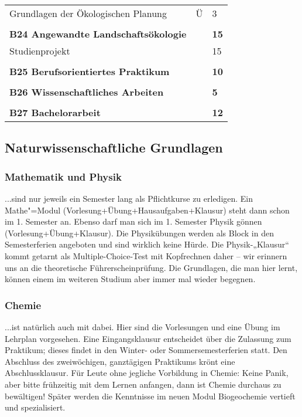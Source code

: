 \begin{longtable}{p{} p{} p{}}
Grundlagen der Ökologischen Planung & Ü & 3\\
&&\\
\textbf{B24 Angewandte Landschaftsökologie} && \textbf{15}\\
Studienprojekt & & 15\\
&&\\
\textbf{B25 Berufsorientiertes Praktikum} & & \textbf{10}\\
&&\\
\textbf{B26 Wissenschaftliches Arbeiten} & & \textbf{5}\\
&&\\
\textbf{B27 Bachelorarbeit} && \textbf{12}\\
\end{longtable}

\subsection*{Naturwissenschaftliche Grundlagen}
\subsubsection*{Mathematik und Physik}
...sind nur jeweils ein Semester lang als Pﬂichtkurse zu erledigen. Ein Mathe"=Modul (Vorlesung+Übung+Hausaufgaben+Klausur) steht dann schon im 1. Semester an. Ebenso darf man sich im 1. Semester Physik gönnen (Vorlesung+Übung+Klausur). Die Physikübungen werden als Block in den Semesterferien angeboten und sind wirklich keine Hürde. Die Physik-„Klausur“ kommt getarnt als Multiple-Choice-Test mit Kopfrechnen daher – wir erinnern uns an die theoretische Führerscheinprüfung. Die Grundlagen, die man hier lernt, können einem im weiteren Studium aber immer mal wieder begegnen.

\subsubsection*{Chemie}
...ist natürlich auch mit dabei. Hier sind die Vorlesungen und eine Übung im Lehrplan vorgesehen. Eine Eingangsklausur entscheidet über die Zulassung zum Praktikum; dieses ﬁndet in den Winter- oder Sommersemesterferien statt. Den Abschluss des zweiwöchigen, ganztägigen Praktikums krönt eine Abschlussklausur. Für Leute ohne jegliche Vorbildung in Chemie: Keine Panik, aber bitte frühzeitig mit dem Lernen anfangen, dann ist Chemie durchaus zu bewältigen! Später werden die Kenntnisse im neuen Modul Biogeochemie vertieft und spezialisiert.

